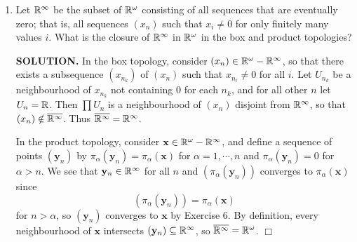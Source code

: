 \documentclass{article}
\begin{document}
\begin{enumerate}
    {\bf SOLUTION.} Suppose $(\mathbf{x}_n)$ converges to $\mathbf{x}$. For any $\alpha$, given a neighbourhood $U_\alpha$ of $\pi_\alpha(\mathbf{x})$, $\pi_\alpha^{-1}(U_\alpha)$ is a neighbourhood of $\mathbf{x}$, meaning there exists $N$ such that $n > N$ implies $\mathbf{x}_n \in \pi_\alpha^{-1}(U_\alpha)$. Then $\pi_\alpha(\mathbf{x}_n) \in U_\alpha$ for $n> N$, showing that $(\pi_\alpha(\mathbf{x}_n))$ converges to $\pi_\alpha(\mathbf{x})$. We remark that all steps in this direction are valid in the box topology.

    Conversely, if $(\pi_\alpha(\mathbf{x}_n))$ converges to $\pi_\alpha(\mathbf{x})$ for each $\alpha$, then given a neighbourhood $U$ of $\mathbf{x}$, $U$ contains a basis element $\prod U_\alpha$, and there are only finitely many values of $\alpha$ such that $U_\alpha \neq X_\alpha$. For these $\alpha$, let $N_\alpha$ be such that $\pi_\alpha(\mathbf{x}_n) \in U_\alpha$ for $n > N_\alpha$, and let $N = \max_{\alpha} N_\alpha$. Thus $\mathbf{x}_n \in \prod U_\alpha \subseteq U$ for $n > N$, showing that $(\mathbf{x}_n)$ converges to $\mathbf{x}$. In the box topology, we may have infinitely many such values $\alpha$ and $\{N_\alpha\}$ may not have a maximum, causing this direction to fail. $\Box$

    \item Let $\mathbb{R}^\infty$ be the subset of $\mathbb{R}^\omega$ consisting of all sequences that are eventually zero; that is, all sequences $(x_n)$ such that $x_i \neq 0$ for only finitely many values $i$. What is the closure of $\mathbb{R}^\infty$ in $\mathbb{R}^\omega$ in the box and product topologies?

    {\bf SOLUTION.} In the box topology, consider $(x_n) \in \mathbb{R}^\omega - \mathbb{R}^\infty$, so that there exists a subsequence $(x_{n_k})$ of $(x_n)$ such that $x_{n_i} \neq 0$ for all $i$. Let $U_{n_k}$ be a neighbourhood of $x_{n_k}$ not containing $0$ for each $n_k$, and for all other $n$ let $U_n = \mathbb{R}$. Then $\prod U_n$ is a neighbourhood of $(x_n)$ disjoint from $\mathbb{R}^\infty$, so that $(x_n) \notin \overline{\mathbb{R}^\infty}$. Thus $\overline{\mathbb{R}^\infty} = \mathbb{R}^\infty$.

    In the product topology, consider $\mathbf{x} \in \mathbb{R}^\omega - \mathbb{R}^\infty$, and define a sequence of points $(\mathbf{y}_n)$ by $\pi_\alpha(\mathbf{y}_n) = \pi_\alpha(\mathbf{x})$ for $\alpha = 1, \cdots, n$ and $\pi_\alpha(\mathbf{y}_n) = 0$ for $\alpha > n$. We see that $\mathbf{y}_n \in \mathbb{R}^\infty$ for all $n$ and $(\pi_\alpha(\mathbf{y}_n))$ converges to $\pi_\alpha(\mathbf{x})$ since 
    $$(\pi_\alpha(\mathbf{y}_n)) = \pi_\alpha(\mathbf{x})$$
    for $n > \alpha$, so $(\mathbf{y}_n)$ converges to $\mathbf{x}$ by Exercise 6. By definition, every neighbourhood of $\mathbf{x}$ intersects $(\mathbf{y}_n) \subseteq \mathbb{R}^\infty$, so $\overline{\mathbb{R}^\infty} = \mathbb{R}^\omega$. $\Box$


\end{enumerate}
\end{document}
